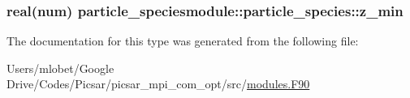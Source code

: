 \subsubsection[{\texorpdfstring{z\+\_\+min}{z_min}}]{\setlength{\rightskip}{0pt plus 5cm}real(num) particle\+\_\+speciesmodule\+::particle\+\_\+species\+::z\+\_\+min}\hypertarget{structparticle__speciesmodule_1_1particle__species_ac0dc85e67cc9339413fd205f454ca487}{}\label{structparticle__speciesmodule_1_1particle__species_ac0dc85e67cc9339413fd205f454ca487}


The documentation for this type was generated from the following file\+:\begin{DoxyCompactItemize}
\item 
Users/mlobet/\+Google Drive/\+Codes/\+Picsar/picsar\+\_\+mpi\+\_\+com\+\_\+opt/src/\hyperlink{modules_8_f90}{modules.\+F90}\end{DoxyCompactItemize}
